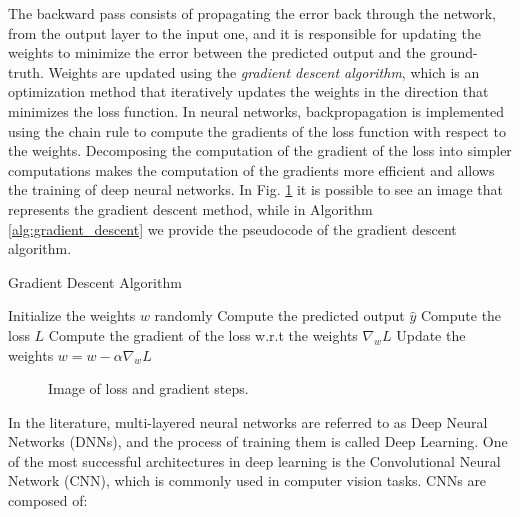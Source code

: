 The backward pass consists of propagating the error back through the network, from the output layer to the input one, and it is responsible for updating the weights to minimize the error between the predicted output and the ground-truth.
Weights are updated using the \textit{gradient descent algorithm}, which is an optimization method that iteratively updates the weights in the direction that minimizes the loss function.
In neural networks, backpropagation is implemented using the chain rule to compute the gradients of the loss function with respect to the weights. 
Decomposing the computation of the gradient of the loss into simpler computations makes the computation of the gradients more efficient and allows the training of deep neural networks.
In Fig. \ref{fig:gradient_descent} it is possible to see an image that represents the gradient descent method, while in Algorithm \ref{alg:gradient_descent} we provide the pseudocode of the gradient descent algorithm.

\begin{algorithm}
\caption{Gradient Descent Algorithm}\label{alg:gradient_descent}
\begin{algorithmic}
    \State Initialize the weights $w$ randomly
        \State Compute the predicted output $\hat{y}$
        \State Compute the loss $L$
        \State Compute the gradient of the loss w.r.t the weights $\nabla_w L$
        \State Update the weights $w = w - \alpha \nabla_w L$
    \EndWhile
\end{algorithmic}
\end{algorithm}





\begin{figure}[ht]
    \begin{center}
        \fbox{\rule[-.5cm]{0cm}{4cm} \rule[-.5cm]{4cm}{0cm}}
    \end{center}
    \caption{Image of loss and gradient steps.}
    \label{fig:gradient_descent}
\end{figure}



In the literature, multi-layered neural networks are referred to as Deep Neural Networks (DNNs), and the process of training them is called Deep Learning.
One of the most successful architectures in deep learning is the Convolutional Neural Network (CNN), which is commonly used in computer vision tasks.
CNNs are composed of:

